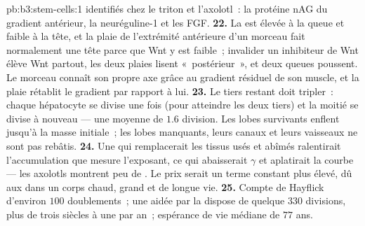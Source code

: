 \begin{solution}{pb:b3:stem-cells:1}
identifiés chez le triton et l'axolotl~: la protéine nAG du gradient
antérieur, la neuréguline-1 et les FGF.
\textbf{22.} La  est élevée à la queue et faible à la
tête, et la plaie de l'extrémité antérieure d'un morceau fait
normalement une tête parce que Wnt y est faible~; invalider un
inhibiteur de Wnt élève Wnt partout, les deux plaies lisent «~postérieur~»,
et deux queues poussent. Le morceau connaît son propre axe grâce au
gradient résiduel de son muscle, et la plaie rétablit le gradient par
rapport à lui.
\textbf{23.} Le tiers restant doit tripler~: chaque hépatocyte se divise
une fois (pour atteindre les deux tiers) et la moitié se divise à
nouveau --- une moyenne de $1.6$ division. Les lobes survivants enflent
jusqu'à la masse initiale~; les lobes manquants, leurs canaux et leurs
vaisseaux ne sont pas rebâtis.
\textbf{24.} Une  qui remplacerait les tissus usés et
abîmés ralentirait l'accumulation que mesure l'exposant, ce qui
abaisserait $\gamma$ et aplatirait la courbe --- les axolotls montrent
peu de . Le prix serait un terme constant plus élevé, dû aux
 dans un corps chaud, grand et de longue vie.
\textbf{25.} Compte de Hayflick d'environ $100$ doublements~; une  aidée par la  dispose de quelque $330$ divisions, plus
de trois siècles à une par an~; espérance de vie médiane de $77$ ans.
\end{solution}
